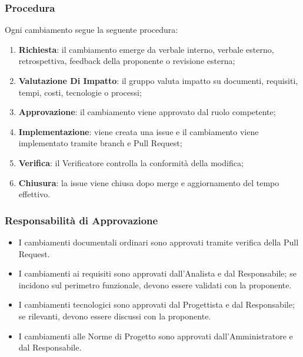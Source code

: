 
\subsubsection{Procedura}

Ogni cambiamento segue la seguente procedura:

\begin{enumerate}
    \item \textbf{Richiesta}: il cambiamento emerge da verbale interno, verbale esterno,
      retrospettiva, feedback della proponente o revisione esterna;

    \item \textbf{Valutazione Di Impatto}: il gruppo valuta impatto su documenti,
    requisiti, tempi, costi, tecnologie o processi;

    \item \textbf{Approvazione}: il cambiamento viene approvato dal ruolo competente;

    \item \textbf{Implementazione}: viene creata una issue e il cambiamento viene
    implementato tramite branch e Pull Request;

    \item \textbf{Verifica}: il Verificatore controlla la conformità della modifica;

    \item \textbf{Chiusura}: la issue viene chiusa dopo merge e aggiornamento del
    tempo effettivo.
\end{enumerate}


\subsubsection{Responsabilità di Approvazione}

\begin{itemize}
    \item I cambiamenti documentali ordinari sono approvati tramite verifica della
    Pull Request.

    \item I cambiamenti ai requisiti sono approvati dall'Analista e dal Responsabile;
    se incidono sul perimetro funzionale, devono essere validati con la proponente.

    \item I cambiamenti tecnologici sono approvati dal Progettista e dal Responsabile;
    se rilevanti, devono essere discussi con la proponente.

    \item I cambiamenti alle Norme di Progetto sono approvati dall'Amministratore e
    dal Responsabile.
\end{itemize}

